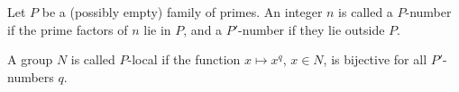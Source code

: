 Let $P$ be a (possibly empty) family of primes. An integer $n$ is called a $P$-number if the prime factors of $n$ lie in $P$, and a $P'$-number if they lie outside $P$.

A group $N$ is called $P$-local if the function $x \mapsto x^q$, $x \in N$, is bijective for all $P'$-numbers $q$.
